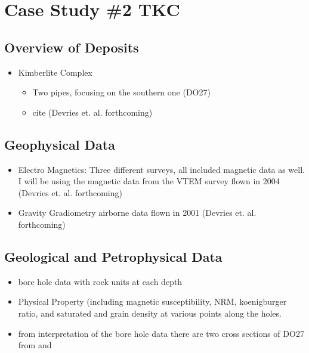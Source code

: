 
\chapter{Case Study \#2 TKC}
\label{ch:CaseStudy2}




\section{Overview of Deposits}
\label{sec:Overview of Deposits:TKC}

\begin{itemize}
\item Kimberlite Complex
\begin{itemize}
\item Two pipes, focusing on the southern one (DO27)
\item cite (Devries et. al. forthcoming)
\end{itemize}
\end{itemize}

\section{Geophysical Data}
\label{sec:Discussion of the Geophysical Data Given:TKC}
%
\begin{itemize}
\item Electro Magnetics: Three different surveys, all included magnetic data as well. I will be using the magnetic data from the VTEM survey flown in 2004 (Devries et. al. forthcoming)
 \item Gravity Gradiometry airborne data flown in 2001  (Devries et. al. forthcoming)
 \end{itemize}

\section{Geological and Petrophysical Data}
\label{sec:What Information is Available:TKC}

\begin{itemize}
\item  bore hole data with rock units at each depth \citep{eggleston2014peregrine}
\item Physical Property (including magnetic susceptibility, NRM, koenigburger ratio, and saturated and grain density at various points along the holes. 
\item from interpretation of the bore hole data there are two cross sections of DO27 from \citep{harder2006geology}  and \cite{harder2009evolution}
\end{itemize}

